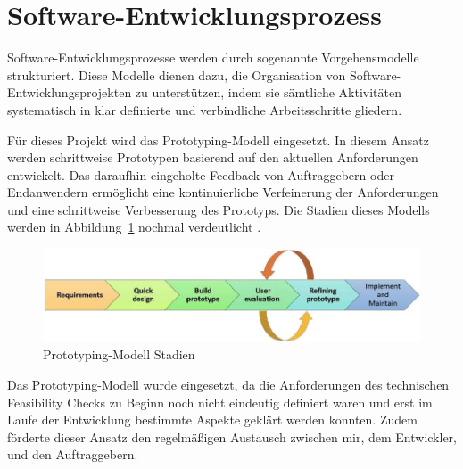 \section{Software-Entwicklungsprozess}
Software-Entwicklungsprozesse werden durch sogenannte Vorgehensmodelle strukturiert. Diese Modelle dienen dazu, die Organisation von Software-Entwicklungsprojekten zu unterstützen, indem sie sämtliche Aktivitäten systematisch in klar definierte und verbindliche Arbeitsschritte gliedern.

Für dieses Projekt wird das Prototyping-Modell eingesetzt. In diesem Ansatz werden schrittweise Prototypen basierend auf den aktuellen Anforderungen entwickelt. Das daraufhin eingeholte Feedback von Auftraggebern oder Endanwendern ermöglicht eine kontinuierliche Verfeinerung der Anforderungen und eine schrittweise Verbesserung des Prototyps. Die Stadien dieses Modells werden in Abbildung~\ref{fig:Prototyping-Modell} nochmal verdeutlicht \cite{senarath2021waterfall}.

\begin{figure}[h!]
    \centering
    \includegraphics[]{bilder/Prototyping_Stages.jpg}
    \caption{Prototyping-Modell Stadien}
    \label{fig:Prototyping-Modell}
\end{figure}


Das Prototyping-Modell wurde eingesetzt, da die Anforderungen des technischen Feasibility Checks zu Beginn noch nicht eindeutig definiert waren und erst im Laufe der Entwicklung bestimmte Aspekte geklärt werden konnten. Zudem förderte dieser Ansatz den regelmäßigen Austausch zwischen mir, dem Entwickler, und den Auftraggebern.